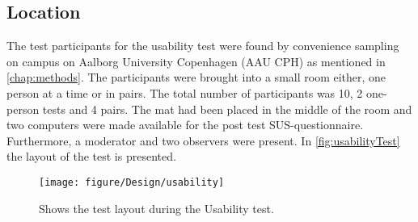 \subsection{Location}
The test participants for the usability test were found by convenience sampling on campus on Aalborg University Copenhagen (AAU CPH) as mentioned in \autoref{chap:methods}. The participants were brought into a small room either, one person at a time or in pairs. The total number of participants was 10, 2 one-person tests and 4 pairs. The mat had been placed in the middle of the room and two computers were made available for the post test SUS-questionnaire. Furthermore, a moderator and two observers were present. In \autoref{fig:usabilityTest} the layout of the test is presented.

\begin{figure}[H]
	\centering
	\texttt{[image: figure/Design/usability]}
	\caption{Shows the test layout during the Usability test.}	
	\label{fig:usabilityTest}
\end{figure}

